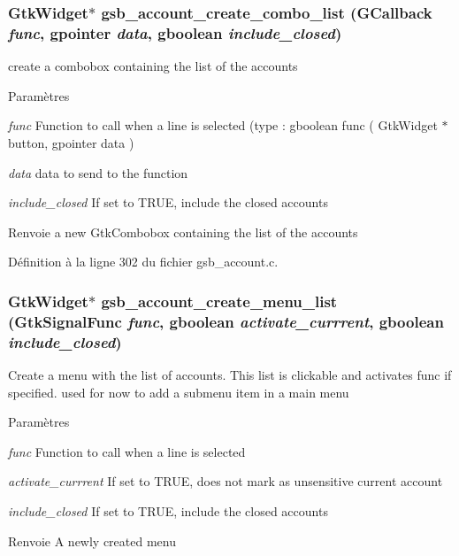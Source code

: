 \subsubsection[{gsb\_\-account\_\-create\_\-combo\_\-list}]{\setlength{\rightskip}{0pt plus 5cm}GtkWidget$\ast$ gsb\_\-account\_\-create\_\-combo\_\-list (GCallback {\em func}, \/  gpointer {\em data}, \/  gboolean {\em include\_\-closed})}\label{gsb__account_8c_a252b9f3c12c50f00a1d1db3e4321460c}
create a combobox containing the list of the accounts


\begin{DoxyParams}{Paramètres}
\item[{\em func}]Function to call when a line is selected (type : gboolean func ( GtkWidget $\ast$button, gpointer data ) \item[{\em data}]data to send to the function \item[{\em include\_\-closed}]If set to TRUE, include the closed accounts\end{DoxyParams}
\begin{DoxyReturn}{Renvoie}
a new GtkCombobox containing the list of the accounts 
\end{DoxyReturn}


Définition à la ligne 302 du fichier gsb\_\-account.c.

\subsubsection[{gsb\_\-account\_\-create\_\-menu\_\-list}]{\setlength{\rightskip}{0pt plus 5cm}GtkWidget$\ast$ gsb\_\-account\_\-create\_\-menu\_\-list (GtkSignalFunc {\em func}, \/  gboolean {\em activate\_\-currrent}, \/  gboolean {\em include\_\-closed})}\label{gsb__account_8c_ac49429f60593df9fe4e9674cd8645fc2}
Create a menu with the list of accounts. This list is clickable and activates func if specified. used for now to add a submenu item in a main menu


\begin{DoxyParams}{Paramètres}
\item[{\em func}]Function to call when a line is selected \item[{\em activate\_\-currrent}]If set to TRUE, does not mark as unsensitive current account \item[{\em include\_\-closed}]If set to TRUE, include the closed accounts\end{DoxyParams}
\begin{DoxyReturn}{Renvoie}
A newly created menu 
\end{DoxyReturn}


